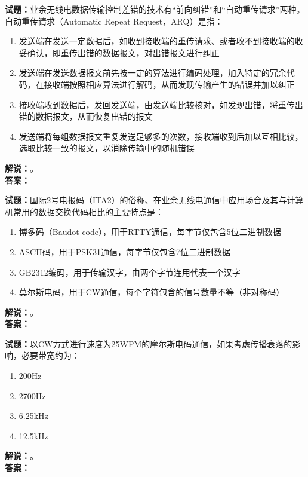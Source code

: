 \documentclass{ctexbook}
\begin{document}
\bigskip




\noindent\textbf{试题：}业余无线电数据传输控制差错的技术有“前向纠错”和“自动重传请求”两种。自动重传请求（Automatic Repeat Request，ARQ）是指：
\begin{enumerate}[leftmargin=3em]
\item 发送端在发送一定数据后，如收到接收端的重传请求、或者收不到接收端的收妥确认，即重传出错的数据报文，对出错报文进行纠正
\item 发送端在发送数据报文前先按一定的算法进行编码处理，加入特定的冗余代码，在接收端按照相应算法进行解码，从而发现传输产生的错误并加以纠正
\item 接收端收到数据后，发回发送端，由发送端比较核对，如发现出错，将重传出错的数据报文，从而恢复出错的报文
\item 发送端将每组数据报文重复发送足够多的次数，接收端收到后加以互相比较，选取比较一致的报文，以消除传输中的随机错误
\end{enumerate}
\noindent\textbf{解说：}\textbf{}。\\\noindent\textbf{答案：}

\bigskip




\noindent\textbf{试题：}国际2号电报码（ITA2）的俗称、在业余无线电通信中应用场合及其与计算机常用的数据交换代码相比的主要特点是：
\begin{enumerate}[leftmargin=3em]
\item 博多码（Baudot code），用于RTTY通信，每字节仅包含5位二进制数据
\item ASCII码，用于PSK31通信，每字节仅包含7位二进制数据
\item GB2312编码，用于传输汉字，由两个字节连用代表一个汉字
\item 莫尔斯电码，用于CW通信，每个字符包含的信号数量不等（非对称码）
\end{enumerate}
\noindent\textbf{解说：}\textbf{}。\\\noindent\textbf{答案：}

\bigskip




\noindent\textbf{试题：}以CW方式进行速度为25WPM的摩尔斯电码通信，如果考虑传播衰落的影响，必要带宽约为：
\begin{enumerate}[leftmargin=3em]
\item 200Hz
\item 2700Hz
\item 6.25\unit{\kHz}
\item 12.5\unit{\kHz}
\end{enumerate}
\noindent\textbf{解说：}\textbf{}。\\\noindent\textbf{答案：}
\end{document}
